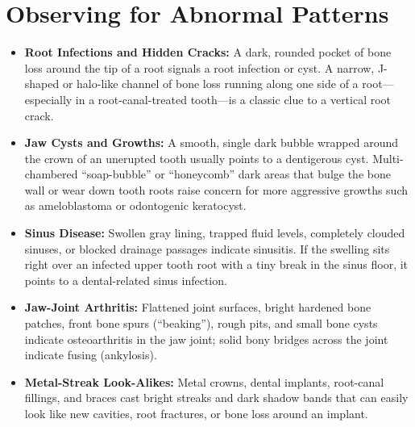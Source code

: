 \section{Observing for Abnormal Patterns}
\begin{itemize}
    \item \textbf{Root Infections and Hidden Cracks:} A dark, rounded pocket of bone loss around the tip of a root signals a root infection or cyst. A narrow, J-shaped or halo-like channel of bone loss running along one side of a root---especially in a root-canal-treated tooth---is a classic clue to a vertical root crack.
    \item \textbf{Jaw Cysts and Growths:} A smooth, single dark bubble wrapped around the crown of an unerupted tooth usually points to a dentigerous cyst. Multi-chambered ``soap-bubble'' or ``honeycomb'' dark areas that bulge the bone wall or wear down tooth roots raise concern for more aggressive growths such as ameloblastoma or odontogenic keratocyst.
    \item \textbf{Sinus Disease:} Swollen gray lining, trapped fluid levels, completely clouded sinuses, or blocked drainage passages indicate sinusitis. If the swelling sits right over an infected upper tooth root with a tiny break in the sinus floor, it points to a dental-related sinus infection.
    \item \textbf{Jaw-Joint Arthritis:} Flattened joint surfaces, bright hardened bone patches, front bone spurs (``beaking''), rough pits, and small bone cysts indicate osteoarthritis in the jaw joint; solid bony bridges across the joint indicate fusing (ankylosis).
    \item \textbf{Metal-Streak Look-Alikes:} Metal crowns, dental implants, root-canal fillings, and braces cast bright streaks and dark shadow bands that can easily look like new cavities, root fractures, or bone loss around an implant.
\end{itemize}

